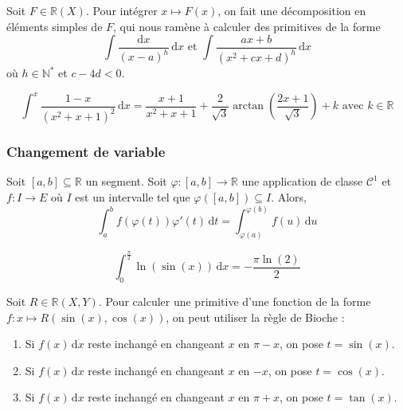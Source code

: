 
  \begin{proposition}
    Soit $F \in \mathbb{R}(X)$. Pour intégrer $x \mapsto F(x)$, on fait une décomposition en éléments simples de $F$, qui nous ramène à calculer des primitives de la forme
    \[ \int \frac{\mathrm{d}x}{(x-a)^h} \, \mathrm{d}x \text{ et } \int \frac{ax+b}{(x^2+cx+d)^h} \, \mathrm{d}x \]
    où $h \in \mathbb{N}^*$ et $c-4d < 0$.
  \end{proposition}

  \begin{example}
    \[ \int^x \frac{1-x}{(x^2+x+1)^2} \, \mathrm{d}x = \frac{x+1}{x^2+x+1} + \frac{2}{\sqrt{3}} \arctan \left( \frac{2x+1}{\sqrt{3}} \right) + k \text{ avec } k \in \mathbb{R} \]
  \end{example}

  \subsubsection{Changement de variable}


  \begin{theorem}
    Soit $[a,b] \subseteq \mathbb{R}$ un segment. Soit $\varphi : [a,b] \rightarrow \mathbb{R}$ une application de classe $\mathcal{C}^1$ et $f : I \rightarrow E$ où $I$ est un intervalle tel que $\varphi([a,b]) \subseteq I$. Alors,
    \[ \int_a^b f(\varphi(t)) \varphi'(t) \, \mathrm{d}t = \int_{\varphi(a)}^{\varphi(b)} f(u) \, \mathrm{d}u \]
  \end{theorem}


  \begin{example}
    \[ \int_0^{\frac{\pi}{2}} \ln(\sin(x)) \, \mathrm{d}x = -\frac{\pi \ln(2)}{2} \]
  \end{example}


  \begin{proposition}
    Soit $R \in \mathbb{R}(X, Y)$. Pour calculer une primitive d'une fonction de la forme $f : x \mapsto R(\sin(x), \cos(x))$, on peut utiliser la règle de Bioche :
    \begin{enumerate}[label={\bfseries(\roman*)}]
      \item Si $f(x) \, \mathrm{d}x$ reste inchangé en changeant $x$ en $\pi - x$, on pose $t = \sin(x)$.
      \item Si $f(x) \, \mathrm{d}x$ reste inchangé en changeant $x$ en $- x$, on pose $t = \cos(x)$.
      \item Si $f(x) \, \mathrm{d}x$ reste inchangé en changeant $x$ en $\pi + x$, on pose $t = \tan(x)$.
    \end{enumerate}
  \end{proposition}

